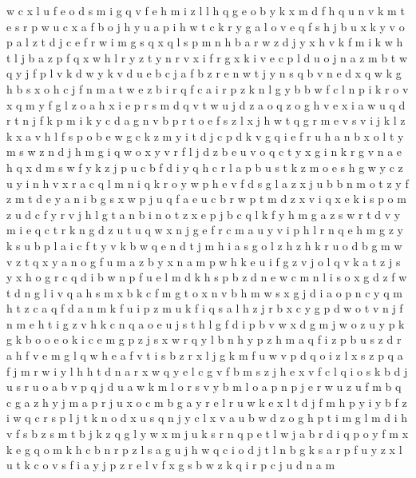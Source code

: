\documentclass{article}
\begin{document}
w c x l u f e o d s m i g q v
f e h m i z l
l h q g e o b y k x m d f
h q u n
v k m t e s r p w u c x a f b o j h y
u a p
i h
w t c k r y g a l o v e q f s h j
b u x k y v o p a l z t d j c e f r w i m g s q
x q l s p m n h b a r w z d j y
x h v k f m i
k w h t l j b
a z p f q x w h l r y
z t y n r v x i
f r g x k i v e c p l d u o j n a z m b t w q y
j
f p l v k d
w y k v d u e b c j a f
b z r e n w t j y
n s q b
v n e d x q w k g
h b s
x o h c j f n m a t w e z b i r
q f c a i r p z k n l g y b
b w f c l n p i k r o v x q m
y f g l z o a h x i e p r s m d q v t
w u j d z a o q
z o g h v e x i a w u q d r t n j f k p
m i k y c d a g n v b p r t o e f s z l x j h w
t q g r m e v
s v i
j k l
z k
x a v h l f s p o b e w g c k z m y i t d j
c p d k v g q i e f r u h a n b x o l t y m s w z
n d j h m g i q w o x y v r f
l j d z b e u v o q c t y x g i n k
r g v n a e h q x d m s w f y k z j p u c b
f d i y q h c r l a p b u s t k z m o e
s h
g w y c
z u y i n h v x r a c q l
m n i q k r o y w p h e v f d s g l a z x j u b
b n m o t z y f
z m t d e y a n i b g s x w p j u q f
a e u c b r w p t m d z x v i q
x e k i s p o m z u d c f y r v j h l g t a n b
i n o t z x e p j b c q l k f y h m g a
z s w r
t d v
y m i e q c t r k n g d z u
t u q
w x n j g e f r c m a u y v i p h l
r n q e h m g z y k s u b p l a i c f t
y v k b w q e n d t j m h i a s g o l z
h z
h k r u o d b g m w v z t q x y a n
o g
f u m a z
b y x n a m p w h k e u i f g z v j o l q
v k a t z j s y x h o g r c q d i b w n p f u e l m
d k h s
p b z d n
e w c m n l i s o x g d z f
w t d n g l i v q a h s m x b
k c f m g t o x n v b h
m w s x g j d i a o p n c y q
m h t z c a q f
d a n m k f u i p z
m u k f i q s a l h z j r b x c y g p d w o t v n
j f n m e h t i g z v
h
k c n q a o e u j s t h l g f d i p b v w x
d g m j w o z u y p k
g k b o
o e
o k i c e m g p z j s x w r q y l b n h
y p z h
m a q f i z p
b u s z d r a h f v e m g l q
w h e a f v t i s b z r x l j
g k m f u w v p d q o i z l x
s z p q a f j m r w i y l h
h t d n a r x w q y e l c g v f b m s z j
h e x v f c l q i o s k b d j u
s r u o a
b v p q
j d u a w k m l o r s v y
b m l o a p
n p j e r w u z
u f m b q c g a z h y j
m a p r j u x o
c m b g a y r e l
r u w k e x l t d j f m h p y i
y b f z i w q c r s p l j t k n o d x u
s q n j y c l x v a u b w d z o g h p t i m
g l m d i h v f s b z
s m t b j k z q
g l y w x m j u k s
r n q p e t l w
j a b r d i q p o y f m x k
e g q o m k h c b n r p z l s
a g u j
h w q c i o d j t l n b g k s a r p f u y z x
l u t k c o v s f i a y j p z r
e l v f x g s b w z k q i r p c j u d n a m
\end{document}
